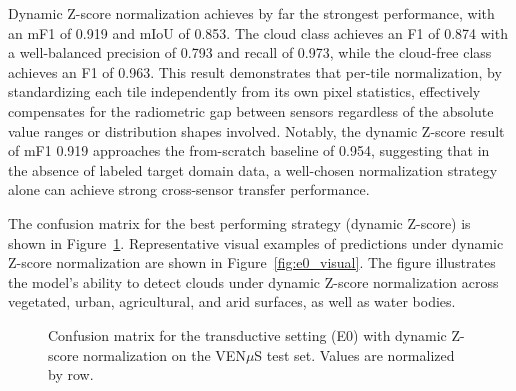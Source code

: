 Dynamic Z-score normalization achieves by far the strongest performance, with an mF1 of 0.919 and mIoU of 0.853. The cloud class achieves an F1 of 0.874 with a well-balanced precision of 0.793 and recall of 0.973, while the cloud-free class achieves an F1 of 0.963. This result demonstrates that per-tile normalization, by standardizing each tile independently from its own pixel statistics, effectively compensates for the radiometric gap between sensors regardless of the absolute value ranges or distribution shapes involved. Notably, the dynamic Z-score result of mF1 0.919 approaches the from-scratch baseline of 0.954, suggesting that in the absence of labeled target domain data, a well-chosen normalization strategy alone can achieve strong cross-sensor transfer performance.

The confusion matrix for the best performing strategy (dynamic Z-score) is shown in Figure~\ref{fig:e0_confusion}. Representative visual examples of predictions under dynamic Z-score normalization are shown in Figure~\ref{fig:e0_visual}. The figure illustrates the model's ability to detect clouds under dynamic Z-score normalization across vegetated, urban, agricultural, and arid surfaces, as well as water bodies.

\begin{figure}[h]
\centering
{}
\caption[Confusion matrix for the transductive setting with dynamic Z-score 
normalization.]{Confusion matrix for the transductive setting (E0) with dynamic Z-score normalization on the VEN$\mu$S test set. Values are normalized by row.}
\label{fig:e0_confusion}
\end{figure}

